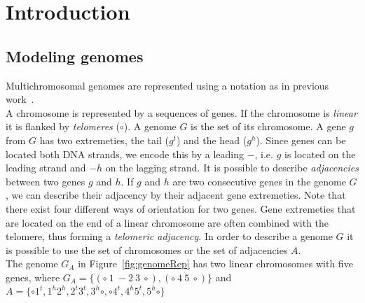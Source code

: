 \chapter{Introduction}



\section{Modeling genomes} %
\label{sub:modeling_genomes}

Multichromosomal genomes are represented using a notation as in previous work~\cite{Bergeron2006}.\\
A chromosome is represented by a sequences of genes.
If the chromosome is \emph{linear} it is flanked by \emph{telomeres} ($\circ$).
A genome $G$ is the set of its chromosome.
A gene $g$ from $G$ has two extremeties, the tail ($g^t$) and the head ($g^h$).
Since genes can be located both DNA strands, we encode this by a leading $-$, i.e. $g$ is located on the leading strand and $-h$ on the lagging strand.
It is possible to describe \emph{adjacencies} between two genes $g$ and $h$. 
If $g$ and $h$ are two consecutive genes in the genome $G$, we can describe their adjacency by their adjacent gene extremeties.
Note that there exist four different ways of orientation for two genes.
Gene extremeties that are located on the end of a linear chromosome are often combined with the telomere, thus forming a  \emph{telomeric adjacency}. 
In order to describe a genome $G$ it is possible to use the set of chromosomes or the set of adjacencies $A$.\\
The genome $G_A$ in Figure~\ref{fig:genomeRep} has two linear chromosomes with five genes, where $G_A=\{(\circ\ 1\ -2\ 3\ \circ),(\circ\ 4\ 5\ \circ)\}$
and $A=\{\circ 1^t, 1^h2^h, 2^t3^t, 3^h\circ, \circ 4^t, 4^h5^t, 5^h\circ\}$\\ \ \\

